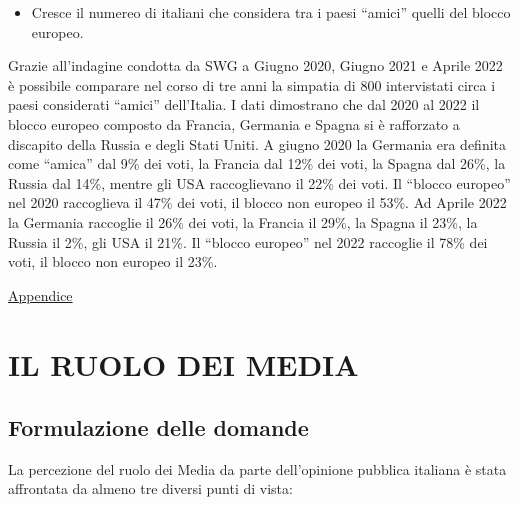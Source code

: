 \documentclass[
  openany]{book}
\providecommand{\tightlist}{%
  \setlength{\itemsep}{0pt}\setlength{\parskip}{0pt}}
\begin{document}
\begin{itemize}
\tightlist
\item
  Cresce il numereo di italiani che considera tra i paesi ``amici'' quelli del blocco europeo.
\end{itemize}

Grazie all'indagine condotta da SWG a Giugno 2020, Giugno 2021 e Aprile 2022 è possibile comparare nel corso di tre anni la simpatia di 800 intervistati circa i paesi considerati ``amici'' dell'Italia. I dati dimostrano che dal 2020 al 2022 il blocco europeo composto da Francia, Germania e Spagna si è rafforzato a discapito della Russia e degli Stati Uniti. A giugno 2020 la Germania era definita come ``amica'' dal 9\% dei voti, la Francia dal 12\% dei voti, la Spagna dal 26\%, la Russia dal 14\%, mentre gli USA raccoglievano il 22\% dei voti. Il ``blocco europeo'' nel 2020 raccoglieva il 47\% dei voti, il blocco non europeo il 53\%. Ad Aprile 2022 la Germania raccoglie il 26\% dei voti, la Francia il 29\%, la Spagna il 23\%, la Russia il 2\%, gli USA il 21\%. Il ``blocco europeo'' nel 2022 raccoglie il 78\% dei voti, il blocco non europeo il 23\%.

\href{https://github.com/LucianaFazio/Ucrania/blob/main/PDF_Appendice/VII.\%20Il\%20clima\%20di\%20opinione\%20v.3.pdf}{Appendice}

\hypertarget{il-ruolo-dei-media}{%
\chapter{IL RUOLO DEI MEDIA}\label{il-ruolo-dei-media}}

\hypertarget{formulazione-delle-domande-6}{%
\section{Formulazione delle domande}\label{formulazione-delle-domande-6}}

La percezione del ruolo dei Media da parte dell'opinione pubblica italiana è stata affrontata da almeno tre diversi punti di vista:
\end{document}
